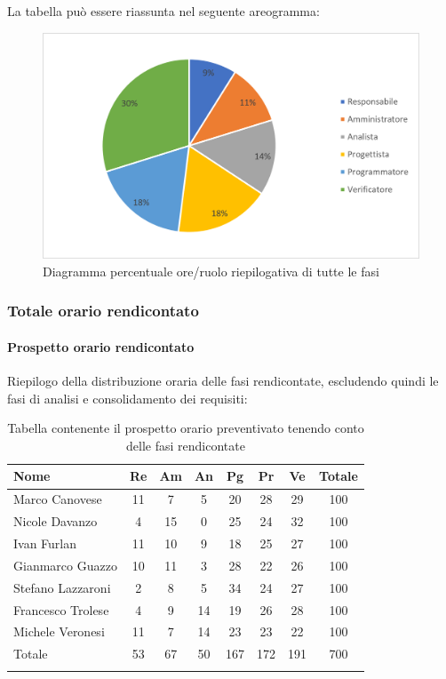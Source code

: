 			La tabella può essere riassunta nel seguente areogramma:
			\begin{figure}[H]
				\centering
				\includegraphics[width=0.8\linewidth]{res/images/preventivo/tot2.png}
				\caption{Diagramma percentuale ore/ruolo riepilogativa di tutte le fasi}
				\label{fig:diagramma costi ruolo riepilogativa di tutte le fasi}
            \end{figure}

			\subsubsection{Totale orario rendicontato}
			\paragraph{Prospetto orario rendicontato}
			Riepilogo della distribuzione oraria delle fasi rendicontate, escludendo quindi le fasi di
analisi e consolidamento dei requisiti:
			
			\begin{longtable}{|l|c|c|c|c|c|c|c|}
				\hline
				\rowcolor{lighter-grayer}
				\textbf{Nome} & \textbf{Re} & \textbf{Am} & \textbf{An} & \textbf{Pg}  & \textbf{Pr}   & \textbf{Ve} & \textbf{Totale} \\
				\hline
				\endfirsthead
				
				\hline
				Marco Canovese & 11 & 7 & 5 & 20 & 28 & 29 & 100\\
				\hline
				\hline
				Nicole Davanzo & 4 & 15 & 0 & 25 & 24 & 32 & 100\\
				\hline
				\hline
				Ivan Furlan & 11 & 10 & 9 & 18 & 25 & 27 & 100\\
				\hline
				\hline
				Gianmarco Guazzo & 10 & 11 & 3 & 28 & 22 & 26 & 100\\
				\hline
				\hline
				Stefano Lazzaroni & 2 & 8 & 5 & 34 & 24 & 27 & 100\\
				\hline
				\hline
				Francesco Trolese & 4 & 9 & 14 & 19 & 26 & 28 & 100\\
				\hline
				\hline
				Michele Veronesi & 11 & 7 & 14 & 23 & 23 & 22 & 100\\
				\hline 
				\hline
				Totale & 53 & 67 & 50 & 167 & 172 & 191 & 700\\
				\hline 
				\rowcolor{white}
				\caption{Tabella contenente il prospetto orario preventivato tenendo conto delle fasi rendicontate}
			\end{longtable}

